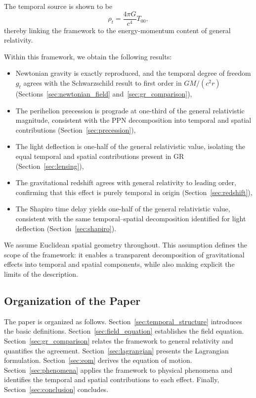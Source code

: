 \documentclass[12pt]{article}
\begin{document}
The temporal source is shown to be
$$
\rho_t = \frac{4\pi G}{c^4} T_{00} ,
$$
thereby linking the framework to the energy-momentum content of general relativity.

Within this framework, we obtain the following results:
\begin{itemize}
\item Newtonian gravity is exactly reproduced, and the temporal degree of freedom $g_t$ agrees with the Schwarzschild result to first order in $GM/(c^2 r)$ (Sections~\ref{sec:newtonian_field} and~\ref{sec:gr_comparison}),
\item The perihelion precession is prograde at one-third of the general relativistic magnitude, consistent with the PPN decomposition into temporal and spatial contributions (Section~\ref{sec:precession}),
\item The light deflection is one-half of the general relativistic value, isolating the equal temporal and spatial contributions present in GR (Section~\ref{sec:lensing}),
\item The gravitational redshift agrees with general relativity to leading order, confirming that this effect is purely temporal in origin (Section~\ref{sec:redshift}),
\item The Shapiro time delay yields one-half of the general relativistic value, consistent with the same temporal--spatial decomposition identified for light deflection (Section~\ref{sec:shapiro}).
\end{itemize}

We assume Euclidean spatial geometry throughout. This assumption defines the scope of the framework: it enables a transparent decomposition of gravitational effects into temporal and spatial components, while also making explicit the limits of the description.

\subsection{Organization of the Paper}

The paper is organized as follows. Section~\ref{sec:temporal_structure} introduces the basic definitions. Section~\ref{sec:field_equation} establishes the field equation. Section~\ref{sec:gr_comparison} relates the framework to general relativity and quantifies the agreement. Section~\ref{sec:lagrangian} presents the Lagrangian formulation. Section~\ref{sec:eom} derives the equation of motion. Section~\ref{sec:phenomena} applies the framework to physical phenomena and identifies the temporal and spatial contributions to each effect. Finally, Section~\ref{sec:conclusion} concludes.
\end{document}

